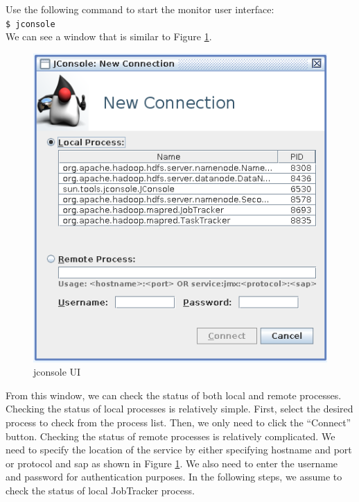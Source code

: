 Use the following command to start the monitor user interface: \\
\verb|$ jconsole| \\

We can see a window that is similar to Figure \ref{fig:jconsole}.
\begin{figure}[ht]
  \centering
  \includegraphics[width=.7\textwidth]{figs/5163os_06_01.png}
  \caption{jconsole UI}\label{fig:jconsole}
\end{figure} 
From this window, we can check the status of both local and remote processes. Checking the status of local processes is relatively simple. First, select the desired process to check from the process list. Then, we only need to click the ``Connect'' button. Checking the status of remote processes is relatively complicated. We need to specify the location of the service by either specifying hostname and port or protocol and sap as shown in Figure \ref{fig:jconsole}. We also need to enter the username and password for authentication purposes.  In the following steps, we assume to check the status of local JobTracker process.

